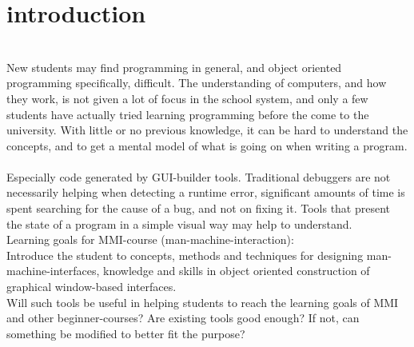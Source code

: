 \section{introduction}\label{introduction}
~\\
New students may find programming in general, and object oriented programming specifically, difficult.
The understanding of computers, and how they work, is not given a lot of focus in the school system, and only a few students have actually tried learning programming before the come to the university.
With little or no previous knowledge, it can be hard to understand the concepts, and to get a mental model of what is going on when writing a program.
~\\

Especially code generated by GUI-builder tools.
Traditional debuggers are not necessarily helping when detecting a runtime error, significant amounts of time is spent searching for the cause of a bug, and not on fixing it\cite{ko2006}.
Tools that present the state of a program in a simple visual way may help to understand.
~\\

Learning goals for MMI-course (man-machine-interaction):\\
Introduce the student to concepts, methods and techniques for designing man-machine-interfaces, knowledge and skills in object oriented construction of graphical window-based interfaces.
~\\

Will such tools be useful in helping students to reach the learning goals of MMI and other beginner-courses?
Are existing tools good enough?
If not, can something be modified to better fit the purpose?